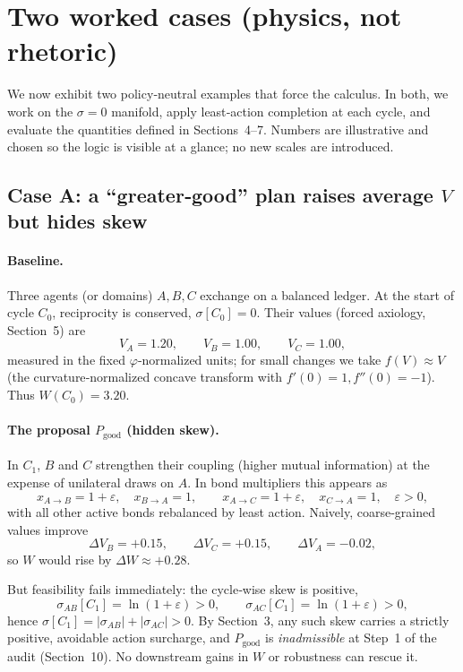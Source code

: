 \documentclass[11pt]{article}
\begin{document}
\section{Two worked cases (physics, not rhetoric)}

We now exhibit two policy‑neutral examples that force the calculus. In both, we work on the $\sigma\!=\!0$ manifold, apply least‑action completion at each cycle, and evaluate the quantities defined in Sections~4–7. Numbers are illustrative and chosen so the logic is visible at a glance; no new scales are introduced.

\subsection*{Case A: a ``greater‑good'' plan raises average $V$ but hides skew}

\paragraph{Baseline.}
Three agents (or domains) $A,B,C$ exchange on a balanced ledger. At the start of cycle $C_0$, reciprocity is conserved, $\sigma[C_0]=0$. Their values (forced axiology, Section~5) are
\[
V_A=1.20,\qquad V_B=1.00,\qquad V_C=1.00,
\]
measured in the fixed $\varphi$‑normalized units; for small changes we take $f(V)\approx V$ (the curvature‑normalized concave transform with $f'(0)=1,f''(0)=-1$). Thus $W(C_0)=3.20$.

\paragraph{The proposal $P_{\text{good}}$ (hidden skew).}
In $C_1$, $B$ and $C$ strengthen their coupling (higher mutual information) at the expense of unilateral draws on $A$. In bond multipliers this appears as
\[
x_{A\to B}=1+\varepsilon,\quad x_{B\to A}=1,\qquad
x_{A\to C}=1+\varepsilon,\quad x_{C\to A}=1,
\quad \varepsilon>0,
\]
with all other active bonds rebalanced by least action. Naively, coarse‑grained values improve
\[
\Delta V_B=+0.15,\qquad \Delta V_C=+0.15,\qquad \Delta V_A=-0.02,
\]
so $W$ would rise by $\Delta W\approx+0.28$.

But feasibility fails immediately: the cycle‑wise skew is positive,
\[
\sigma_{AB}[C_1]=\ln(1+\varepsilon)>0,\qquad
\sigma_{AC}[C_1]=\ln(1+\varepsilon)>0,
\]
hence $\sigma[C_1]=|\sigma_{AB}|+|\sigma_{AC}|>0$. By Section~3, any such skew carries a strictly positive, avoidable action surcharge, and $P_{\text{good}}$ is \emph{inadmissible} at Step~1 of the audit (Section~10). No downstream gains in $W$ or robustness can rescue it.
\end{document}
